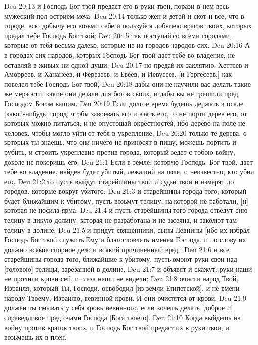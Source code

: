 \vs Deu 20:13 и  Господь Бог твой предаст его в руки твои, порази в нем весь мужеский пол острием меча;
\vs Deu 20:14 только жен и детей и скот и все, что в городе, всю добычу его возьми себе и пользуйся добычею врагов твоих, которых предал тебе Господь Бог твой;
\vs Deu 20:15 так поступай со всеми городами, которые от тебя весьма далеко, которые не из  городов народов сих.
\vs Deu 20:16 А в городах сих народов, которых Господь Бог твой дает тебе во владение, не оставляй в живых ни одной души,
\vs Deu 20:17 но предай их заклятию: Хеттеев и Аморреев, и Хананеев, и Ферезеев, и Евеев, и Иевусеев, [и Гергесеев,] как повелел тебе Господь Бог твой,
\vs Deu 20:18 дабы они не научили вас делать такие же мерзости, какие они делали для богов своих, и дабы вы не грешили пред Господом Богом вашим.
\vs Deu 20:19 Если долгое время будешь держать в осаде [какой-нибудь] город, чтобы завоевать его и взять его, то не порти дерев его, от которых можно питаться, и не опустошай окрестностей, ибо дерево на поле не человек, чтобы могло уйти от тебя в укрепление;
\vs Deu 20:20 только те дерева, о которых ты знаешь, что они ничего не приносят в пищу, можешь портить и рубить, и строить укрепление против города, который ведет с тобою войну, доколе не покоришь его.
\vs Deu 21:1 Если в земле, которую Господь, Бог твой, дает тебе во владение, найден будет убитый, лежащий на поле, и неизвестно, кто убил его,
\vs Deu 21:2 то пусть выйдут старейшины твои и судьи твои и измерят  до городов, которые вокруг убитого;
\vs Deu 21:3 и старейшины города того, который будет ближайшим к убитому, пусть возьмут телицу, на которой не работали, [и] которая не носила ярма,
\vs Deu 21:4 и пусть старейшины того города отведут сию телицу в дикую долину, которая не разработана и не засеяна, и заколют там телицу в долине;
\vs Deu 21:5 и придут священники, сыны Левиины [ибо их избрал Господь Бог твой служить Ему и благословлять именем Господа, и по слову их должно  всякое спорное дело и всякий причиненный вред,]
\vs Deu 21:6 и все старейшины города того, ближайшие к убитому, пусть омоют руки свои над [головою] телицы, зарезанной в долине,
\vs Deu 21:7 и объявят и скажут: руки наши не пролили крови сей, и глаза наши не видели;
\vs Deu 21:8 очисти народ Твой, Израиля, который Ты, Господи, освободил [из земли Египетской], и не вмени народу Твоему, Израилю, невинной крови. И они очистятся от крови.
\vs Deu 21:9  должен ты смывать у себя кровь невинного, если хочешь делать [доброе и] справедливое пред очами Господа [Бога твоего].
\rsbpar\vs Deu 21:10 Когда выйдешь на войну против врагов твоих, и Господь Бог твой предаст их в руки твои, и возьмешь их в плен,

